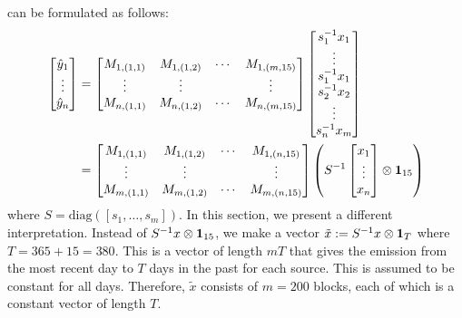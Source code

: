 \documentclass{article}
\begin{document}
 can be formulated as follows:
\begin{align}
    \label{eq: initial model concise} 
\begin{bmatrix}
    \hat{y}_1 \\ 
    \vdots \\
    \hat{y}_{n}
\end{bmatrix}
&=
\begin{bmatrix}
    M_{1,(1,1)} & M_{1,(1,2)} & \cdots & M_{1,(m,15)} \\
    \vdots & \vdots & & \vdots \\
    M_{n,(1,1)} & M_{n,(1,2)} & \cdots & M_{n,(m,15)} \\
\end{bmatrix}
\begin{bmatrix}
    s_1^{-1} x_1\\
    \vdots \\
    s_1^{-1} x_1 \\
    s_2^{-1} x_2 \\
    \vdots \\
    s_n^{-1} x_m
\end{bmatrix} 
\\
&=
\begin{bmatrix}
    M_{1,(1,1)} & M_{1,(1,2)} & \cdots & M_{1,(n,15)} \\
    \vdots & \vdots & & \vdots \\
    M_{m,(1,1)} & M_{m,(1,2)} & \cdots & M_{m,(n,15)} \\
\end{bmatrix}
\left( 
     S^{-1}
     \begin{bmatrix}
        x_1 \\
        \vdots \\
        x_n
     \end{bmatrix}
     \otimes \vb{1}_{15}
\right)
\nonumber
\end{align}
where $S = \mathrm{diag}([s_1,\dots,s_m])$.
In this section, we present a different interpretation. Instead of $S^{-1} x \otimes \vb{1}_{15}$, we make a vector $\tilde{x} := S^{-1} x \otimes \vb{1}_{T}$ where $T = 365 + 15 = 380$. This is a vector of length $mT$ that gives the emission from the most recent day to $T$ days in the past for each source. This is assumed to be constant for all days. Therefore, $\tilde{x}$ consists of $m = 200$ blocks, each of which is a constant vector of length $T$.
\end{document}
